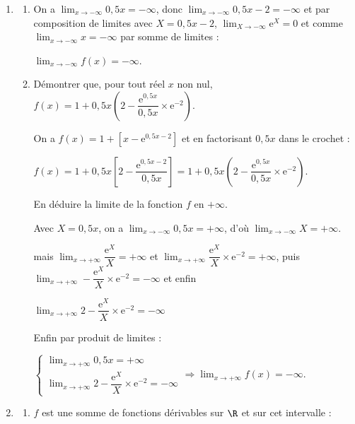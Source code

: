 \begin{enumerate}
\item 
	\begin{enumerate}
		\item %
On a $\displaystyle\lim_{x \to - \infty} 0,5x = - \infty$, donc $\displaystyle\lim_{x \to - \infty} 0,5x - 2 = - \infty$ et par composition de limites avec $X = 0,5x - 2$, $\displaystyle\lim_{X \to - \infty} \text{e}^X = 0$ et comme $\displaystyle\lim_{x \to - \infty} x = - \infty$ par somme de limites :

$\displaystyle\lim_{x \to - \infty} f(x) = - \infty$.
		\item Démontrer que, pour tout réel $x$ non nul, $f(x) = 1+ 0,5x\left(2 - \dfrac{\text{e}^{0,5x}}{0,5x} \times \text{e}^{-2}\right)$.

On a $f(x) = 1 + \left[x - \text{e}^{0,5x - 2}\right]$ et en factorisant $0,5x$ dans le crochet :

$f(x)  = 1 + 0,5x\left[2 - \dfrac{\text{e}^{0,5x - 2}}{0,5x} \right] =  1+ 0,5x\left(2 - \dfrac{\text{e}^{0,5x}}{0,5x} \times \text{e}^{-2}\right)$.

En déduire la limite de la fonction $f$ en $+\infty$.

Avec $X = 0,5x$, on a $\displaystyle\lim_{x \to - \infty}0,5x = + \infty$, d'où $\displaystyle\lim_{x \to - \infty} X = + \infty$.

mais $\displaystyle\lim_{x \to + \infty}\dfrac{\text{e}^X}{X} = + \infty$ et $\displaystyle\lim_{x \to + \infty}\dfrac{\text{e}^X}{X} \times \text{e}^{-2} = + \infty$, puis $\displaystyle\lim_{x \to + \infty}-\dfrac{\text{e}^X}{X} \times \text{e}^{-2} = - \infty$ et enfin

$\displaystyle\lim_{x \to + \infty}2 -\dfrac{\text{e}^X}{X} \times \text{e}^{-2} = - \infty$

Enfin par produit de limites :

$\left\{\begin{array}{l}
\displaystyle\lim_{x \to + \infty} 0,5x = + \infty\\
\displaystyle\lim_{x \to + \infty}2 -\dfrac{\text{e}^X}{X} \times \text{e}^{-2} = - \infty
\end{array}\right. \Rightarrow \displaystyle\lim_{x \to + \infty}f(x) = - \infty$.

	\end{enumerate}
\item 
	\begin{enumerate}
		\item %
$f$ est une somme de fonctions dérivables sur $\R$ et sur cet intervalle :


\end{enumerate}
\end{enumerate}
